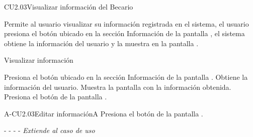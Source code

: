 
\begin{UseCase}{CU2.03}{Visualizar información del Becario}{
    Permite al usuario  visualizar su información registrada en el sistema, el usuario presiona el botón  ubicado en la sección Información de la pantalla , el sistema obtiene la información del usuario y la muestra en la pantalla .
       
    \bigskip
}
		
\end{UseCase}
	
	\begin{UCtrayectoria}{Visualizar información }
	
	    \UCpaso[\UCactor]Presiona el botón  ubicado en la sección Información de la pantalla .
		\UCpaso[\UCsist] Obtiene la información del usuario.
		\UCpaso[\UCsist] Muestra la pantalla  con la información obtenida. 
        \UCpaso[\UCactor]Presiona el botón  de la pantalla .
		
	\end{UCtrayectoria}
	


	
	\begin{UCtrayectoriaA}{A-CU2.03}{Editar información}{A}
	    \UCpaso[\UCactor]Presiona el botón  de la pantalla .
	    \item[- -] - - {\em Extiende al caso de uso } 
	\end{UCtrayectoriaA}
	
